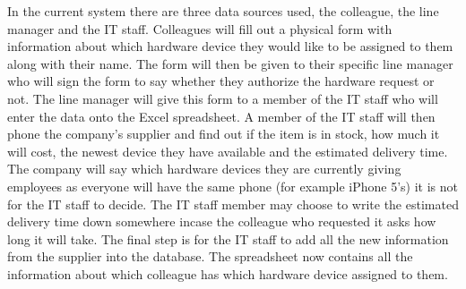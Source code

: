 In the current system there are three data sources used, the colleague, the line manager and the IT staff. Colleagues will fill out a physical form with information about which hardware device they would like to be assigned to them along with their name. The form will then be given to their specific line manager who will sign the form to say whether they authorize the hardware request or not. The line manager will give this form to a member of the IT staff who will enter the data onto the Excel spreadsheet. A member of the IT staff will then phone the company's supplier and find out if the item is in stock, how much it will cost, the newest device they have available and the estimated delivery time. The company will say which hardware devices they are currently giving employees as everyone will have the same phone (for example iPhone 5's) it is not for the IT staff to decide. The IT staff member may choose to write the estimated delivery time down somewhere incase the colleague who requested it asks how long it will take. The final step is for the IT staff to add all the new information from the supplier into the database. The spreadsheet now contains all the information about which colleague has which hardware device assigned to them.

